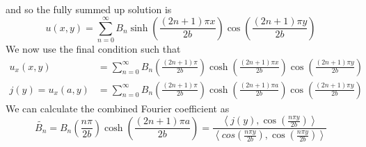 \documentclass{article}
\theoremstyle{definition}
\begin{document}
and so the fully summed up solution is 
\begin{equation*}
    u(x,y) = \sum^\infty_{n=0} B_n\sinh \left( \frac{(2n+1)\pi x}{2b} \right) \cos\left( \frac{(2n+1)\pi y}{2b} \right)
\end{equation*}
We now use the final condition such that 
\begin{equation*}
    \begin{split}
        u_x(x,y) &= \sum^\infty_{n=0} B_n \left(\frac{(2n+1)\pi}{2b} \right) \cosh \left( \frac{(2n+1)\pi x}{2b} \right) \cos\left( \frac{(2n+1)\pi y}{2b} \right) \\
        j(y)=u_x(a,y)&=\sum^\infty_{n=0} B_n \left(\frac{(2n+1)\pi}{2b} \right) \cosh \left( \frac{(2n+1)\pi a}{2b} \right) \cos\left( \frac{(2n+1)\pi y}{2b} \right) 
    \end{split}
\end{equation*}
We can calculate the combined Fourier coefficient as 
\begin{equation*}
    \tilde{B_n} = B_n\left( \frac{n\pi}{2b} \right) \cosh \left( \frac{(2n+1)\pi a}{2b} \right) = \frac{\left\langle j(y),\cos \left( \frac{n\pi y}{2b} \right) \right\rangle }{\left\langle cos \left( \frac{n\pi y}{2b} \right),\cos \left( \frac{n\pi y}{2b} \right) \right\rangle}
\end{equation*}
\end{document}
